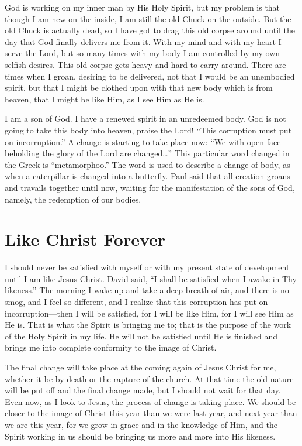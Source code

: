 God is working on my inner man by His Holy Spirit, but
my problem is that though I am new on the inside, I am still
the old Chuck on the outside. But the old Chuck is actually
dead, so I have got to drag this old corpse around until the
day that God finally delivers me from it. With my mind and
with my heart I serve the Lord, but so many times with my
body I am controlled by my own selfish desires. This old
corpse gets heavy and hard to carry around. There are times
when I groan, desiring to be delivered, not that I would be
an unembodied spirit, but that I might be clothed upon with
that new body which is from heaven, that I might be like
Him, as I see Him as He is.

I am a son of God. I have a renewed spirit in an unredeemed
body. God is not going to take this body into
heaven, praise the Lord! “This corruption must put on incorruption.”
A change is starting to take place now: “We with
open face beholding the glory of the Lord are changed…”
This particular word changed in the Greek is “metamorphoo.”
The word is used to describe a change of body, as when a
caterpillar is changed into a butterfly. Paul said that all creation
groans and travails together until now, waiting for the
manifestation of the sons of God, namely, the redemption of
our bodies.


\section*{Like Christ Forever}

I should never be satisfied with myself or with my present
state of development until I am like Jesus Christ. David
said, “I shall be satisfied when I awake in Thy likeness.” The
morning I wake up and take a deep breath of air, and there
is no smog, and I feel so different, and I realize that this corruption
has put on incorruption—then I will be satisfied, for
I will be like Him, for I will see Him as He is. That is what
the Spirit is bringing me to; that is the purpose of the work
of the Holy Spirit in my life. He will not be satisfied until He
is finished and brings me into complete conformity to the
image of Christ.

The final change will take place at the coming again of
Jesus Christ for me, whether it be by death or the rapture of
the church. At that time the old nature will be put off and
the final change made, but I should not wait for that day.
Even now, as I look to Jesus, the process of change is taking
place. We should be closer to the image of Christ this year
than we were last year, and next year than we are this year,
for we grow in grace and in the knowledge of Him, and the
Spirit working in us should be bringing us more and more
into His likeness.


